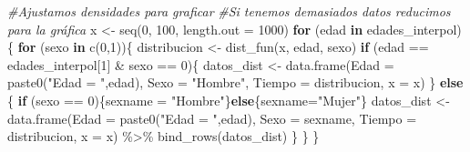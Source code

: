 \documentclass[
]{article}
\newenvironment{Shaded}{\begin{snugshade}}{\end{snugshade}}
\newcommand{\AttributeTok}[1]{\textcolor[rgb]{0.77,0.63,0.00}{#1}}
\newcommand{\CommentTok}[1]{\textcolor[rgb]{0.56,0.35,0.01}{\textit{#1}}}
\newcommand{\ControlFlowTok}[1]{\textcolor[rgb]{0.13,0.29,0.53}{\textbf{#1}}}
\newcommand{\DecValTok}[1]{\textcolor[rgb]{0.00,0.00,0.81}{#1}}
\newcommand{\FunctionTok}[1]{\textcolor[rgb]{0.00,0.00,0.00}{#1}}
\newcommand{\NormalTok}[1]{#1}
\newcommand{\OtherTok}[1]{\textcolor[rgb]{0.56,0.35,0.01}{#1}}
\newcommand{\SpecialCharTok}[1]{\textcolor[rgb]{0.00,0.00,0.00}{#1}}
\newcommand{\StringTok}[1]{\textcolor[rgb]{0.31,0.60,0.02}{#1}}
\begin{document}
\begin{Shaded}
\begin{Highlighting}[]
\CommentTok{\#Ajustamos densidades para graficar}
\CommentTok{\#Si tenemos demasiados datos reducimos para la gráfica}
\NormalTok{x             }\OtherTok{\textless{}{-}} \FunctionTok{seq}\NormalTok{(}\DecValTok{0}\NormalTok{, }\DecValTok{100}\NormalTok{, }\AttributeTok{length.out =} \DecValTok{1000}\NormalTok{) }
\ControlFlowTok{for}\NormalTok{ (edad }\ControlFlowTok{in}\NormalTok{ edades\_interpol)\{}
  \ControlFlowTok{for}\NormalTok{ (sexo }\ControlFlowTok{in} \FunctionTok{c}\NormalTok{(}\DecValTok{0}\NormalTok{,}\DecValTok{1}\NormalTok{))\{}
\NormalTok{    distribucion }\OtherTok{\textless{}{-}} \FunctionTok{dist\_fun}\NormalTok{(x, edad, sexo)}
    \ControlFlowTok{if}\NormalTok{ (edad }\SpecialCharTok{==}\NormalTok{ edades\_interpol[}\DecValTok{1}\NormalTok{] }\SpecialCharTok{\&}\NormalTok{ sexo }\SpecialCharTok{==} \DecValTok{0}\NormalTok{)\{}
\NormalTok{      datos\_dist }\OtherTok{\textless{}{-}} \FunctionTok{data.frame}\NormalTok{(}\AttributeTok{Edad =} \FunctionTok{paste0}\NormalTok{(}\StringTok{"Edad = "}\NormalTok{,edad), }\AttributeTok{Sexo =} \StringTok{"Hombre"}\NormalTok{, }
                               \AttributeTok{Tiempo =}\NormalTok{ distribucion, }\AttributeTok{x =}\NormalTok{ x)}
\NormalTok{    \} }\ControlFlowTok{else}\NormalTok{ \{}
      \ControlFlowTok{if}\NormalTok{ (sexo }\SpecialCharTok{==} \DecValTok{0}\NormalTok{)\{sexname }\OtherTok{=} \StringTok{"Hombre"}\NormalTok{\}}\ControlFlowTok{else}\NormalTok{\{sexname}\OtherTok{=}\StringTok{"Mujer"}\NormalTok{\}}
\NormalTok{      datos\_dist }\OtherTok{\textless{}{-}} \FunctionTok{data.frame}\NormalTok{(}\AttributeTok{Edad =} \FunctionTok{paste0}\NormalTok{(}\StringTok{"Edad = "}\NormalTok{,edad), }\AttributeTok{Sexo =}\NormalTok{ sexname, }
                               \AttributeTok{Tiempo =}\NormalTok{ distribucion, }\AttributeTok{x =}\NormalTok{ x) }\SpecialCharTok{\%\textgreater{}\%} 
        \FunctionTok{bind\_rows}\NormalTok{(datos\_dist)}
\NormalTok{    \}}
\NormalTok{  \}}
\NormalTok{\}}


\end{Highlighting}
\end{Shaded}
\end{document}

